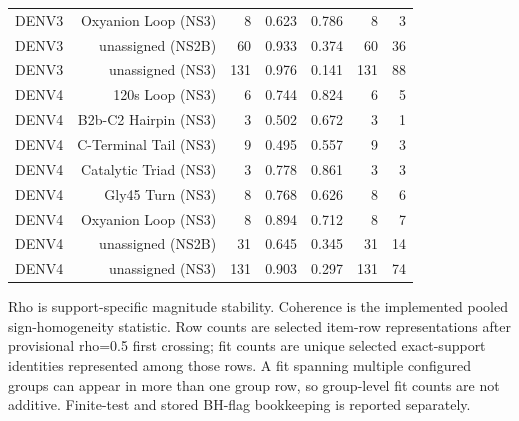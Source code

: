 \begin{table}[t]
\begin{tabular}{lrrrrrr}
    DENV3 & Oxyanion Loop (NS3) & 8 & 0.623 & 0.786 & 8 & 3 \\
    DENV3 & unassigned (NS2B) & 60 & 0.933 & 0.374 & 60 & 36 \\
    DENV3 & unassigned (NS3) & 131 & 0.976 & 0.141 & 131 & 88 \\
    DENV4 & 120s Loop (NS3) & 6 & 0.744 & 0.824 & 6 & 5 \\
    DENV4 & B2b-C2 Hairpin (NS3) & 3 & 0.502 & 0.672 & 3 & 1 \\
    DENV4 & C-Terminal Tail (NS3) & 9 & 0.495 & 0.557 & 9 & 3 \\
    DENV4 & Catalytic Triad (NS3) & 3 & 0.778 & 0.861 & 3 & 3 \\
    DENV4 & Gly45 Turn (NS3) & 8 & 0.768 & 0.626 & 8 & 6 \\
    DENV4 & Oxyanion Loop (NS3) & 8 & 0.894 & 0.712 & 8 & 7 \\
    DENV4 & unassigned (NS2B) & 31 & 0.645 & 0.345 & 31 & 14 \\
    DENV4 & unassigned (NS3) & 131 & 0.903 & 0.297 & 131 & 74 \\
    \bottomrule
  \end{tabular}
  \par\smallskip
  \begin{minipage}{0.98\linewidth}\footnotesize
  Rho is support-specific magnitude stability. Coherence is the implemented pooled sign-homogeneity statistic. Row counts are selected item-row representations after provisional rho=0.5 first crossing; fit counts are unique selected exact-support identities represented among those rows. A fit spanning multiple configured groups can appear in more than one group row, so group-level fit counts are not additive. Finite-test and stored BH-flag bookkeeping is reported separately.
  \end{minipage}
\end{table}
